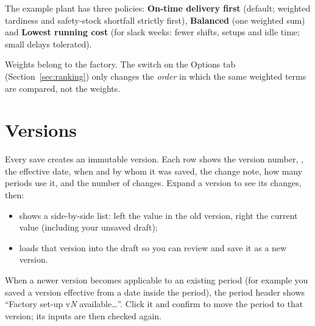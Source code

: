 The example plant has three policies: \textbf{On-time delivery first} (default; weighted tardiness and
safety-stock shortfall strictly first), \textbf{Balanced} (one weighted sum) and \textbf{Lowest running cost}
(for slack weeks: fewer shifts, setups and idle time; small delays tolerated).

\begin{note}
Weights belong to the factory. The  switch on the Options tab
(Section~\ref{sec:ranking}) only changes the \emph{order} in which the same weighted terms are compared, not the
weights.
\end{note}

\section{Versions}\label{sec:factory-versions}


Every save creates an immutable version. Each row shows the version number, , the effective date,
when and by whom it was saved, the change note, how many periods use it, and the number of changes. Expand a
version to see its changes, then:

\begin{itemize}
  \item {} shows a side-by-side list: left the value in the old version, right
        the current value (including your unsaved draft);
  \item {} loads that version into the draft so you can review and save it as a new
        version.
\end{itemize}


\begin{tip}
When a newer version becomes applicable to an existing period (for example you saved a version effective
from a date inside the period), the period header shows ``Factory set-up v\textit{N} available\dots''. Click it
and confirm  to move the period to that version; its inputs are then checked again.
\end{tip}
